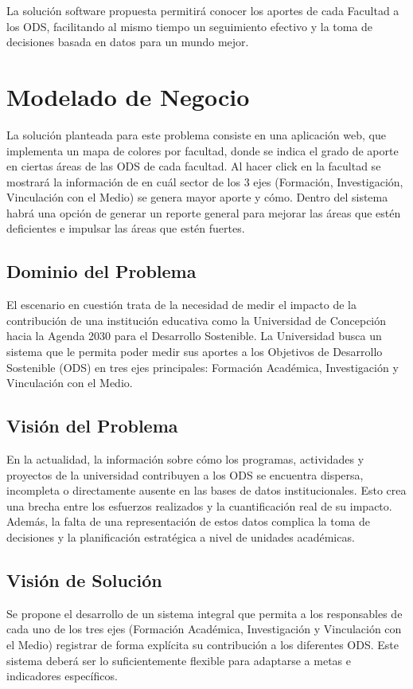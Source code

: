 \documentclass[12pt]{article}
\begin{document}
La solución software propuesta permitirá conocer los aportes de cada Facultad a los ODS, facilitando al mismo tiempo un seguimiento efectivo y la toma de decisiones basada en datos para un mundo mejor.

\clearpage
\section{Modelado de Negocio}

La solución planteada para este problema consiste en una aplicación web, que implementa un mapa de colores por facultad, donde se indica el grado de aporte en ciertas áreas de las ODS  de cada facultad. Al hacer click en la facultad se mostrará la información de en cuál sector de los 3 ejes (Formación, Investigación, Vinculación con el Medio) se genera mayor aporte y cómo. Dentro del sistema habrá una opción de generar un reporte general para mejorar las áreas que estén deficientes e impulsar las áreas que estén fuertes.

\subsection{Dominio del Problema}
El escenario en cuestión trata de la necesidad de medir el impacto de la contribución de una institución educativa como la Universidad de Concepción hacia la Agenda 2030 para el Desarrollo Sostenible. La Universidad busca un sistema que le permita poder medir sus aportes a los Objetivos de Desarrollo Sostenible (ODS) en tres ejes principales: Formación Académica, Investigación y Vinculación con el Medio.
\subsection{Visión del Problema}
En la actualidad, la información sobre cómo los programas, actividades y proyectos de la universidad contribuyen a los ODS se encuentra dispersa, incompleta o directamente ausente en las bases de datos institucionales. Esto crea una brecha entre los esfuerzos realizados y la cuantificación real de su impacto. Además, la falta de una representación de estos datos complica la toma de decisiones y la planificación estratégica a nivel de unidades académicas.
\subsection{Visión de Solución}
Se propone el desarrollo de un sistema integral que permita a los responsables de cada uno de los tres ejes (Formación Académica, Investigación y Vinculación con el Medio) registrar de forma explícita su contribución a los diferentes ODS. Este sistema deberá ser lo suficientemente flexible para adaptarse a metas e indicadores específicos. 
\clearpage
\end{document}
